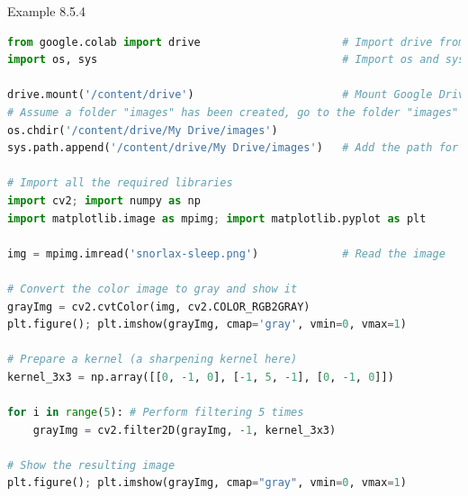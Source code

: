 \documentclass{book}
\begin{document}
\begin{egBox}{Example 8.5.4}{}
    \begin{lstlisting}[language=Python, basicstyle=\ttfamily\small, keywordstyle=\color{blue}, commentstyle=\color{forestgreen}, stringstyle=\color{red}, showstringspaces=false]
from google.colab import drive                      # Import drive from google.colab package
import os, sys                                      # Import os and sys modules

drive.mount('/content/drive')                       # Mount Google Drive
# Assume a folder "images" has been created, go to the folder "images"
os.chdir('/content/drive/My Drive/images')
sys.path.append('/content/drive/My Drive/images')   # Add the path for interpreter to search

# Import all the required libraries
import cv2; import numpy as np
import matplotlib.image as mpimg; import matplotlib.pyplot as plt

img = mpimg.imread('snorlax-sleep.png')             # Read the image

# Convert the color image to gray and show it
grayImg = cv2.cvtColor(img, cv2.COLOR_RGB2GRAY)
plt.figure(); plt.imshow(grayImg, cmap='gray', vmin=0, vmax=1)

# Prepare a kernel (a sharpening kernel here)
kernel_3x3 = np.array([[0, -1, 0], [-1, 5, -1], [0, -1, 0]])

for i in range(5): # Perform filtering 5 times
    grayImg = cv2.filter2D(grayImg, -1, kernel_3x3)

# Show the resulting image
plt.figure(); plt.imshow(grayImg, cmap="gray", vmin=0, vmax=1)


\end{lstlisting}
\end{egBox}
\end{document}
